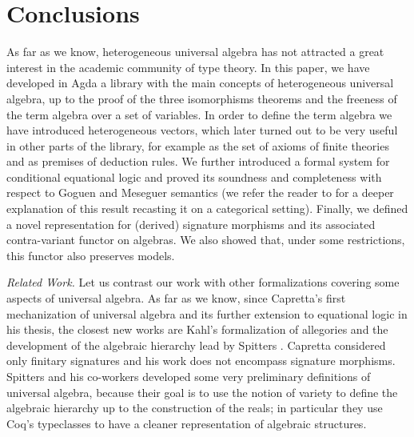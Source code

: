 \section{Conclusions}
\label{sec:conclusions}

As far as we know, heterogeneous universal algebra has not attracted a
great interest in the academic community of type theory. In this
paper, we have developed in Agda a library with the main concepts of
heterogeneous universal algebra, up to the proof of the three
isomorphisms theorems and the freeness of the term algebra over a set
of variables. In order to define the term algebra we have introduced
heterogeneous vectors, which later turned out to be very useful in
other parts of the library, for example as the set of axioms of finite
theories and as premises of deduction rules. We further introduced a
formal system for conditional equational logic and proved its
soundness and completeness with respect to Goguen and Meseguer
semantics (we refer the reader to \cite{vidal-06} for a deeper
explanation of this result recasting it on a categorical
setting). Finally, we defined a novel representation for (derived)
signature morphisms and its associated contra-variant functor on
algebras. We also showed that, under some restrictions, this functor
also preserves models.

\textit{Related Work.} Let us contrast our work with other
formalizations covering some aspects of universal algebra. As far as
we know, since Capretta's \cite{capretta-99} first mechanization of
universal algebra and its further extension to equational logic in his
thesis, the closest new works are Kahl's \cite{kahl-2011}
formalization of allegories and the development of the algebraic
hierarchy lead by Spitters \cite{spitters-algebraic-11}. Capretta
considered only finitary signatures and his work does not encompass
signature morphisms. Spitters and his co-workers developed some very
preliminary definitions of universal algebra, because their goal is to
use the notion of variety to define the algebraic hierarchy up to the
construction of the reals; in particular they use Coq's typeclasses to
have a cleaner representation of algebraic structures.


